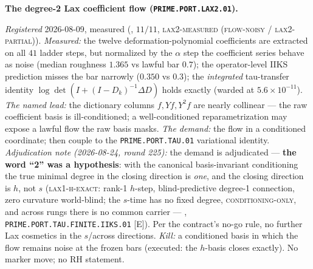 \documentclass[11pt,a4paper]{article}
\begin{document}
\par\smallskip\noindent\textbf{The degree-2 Lax coefficient flow
(\texttt{PRIME.PORT.\allowbreak LAX2.01}).}
{\sloppy
\emph{Registered} 2026-08-09, measured
(, $11/11$,
\textsc{lax2-measured (flow-noisy / lax2-partial)}).
\emph{Measured:} the twelve deformation-polynomial coefficients
are extracted on all $41$ ladder steps, but normalized by the
$\alpha$ step the coefficient series behave as noise (median
roughness $1.365$ vs lawful bar $0.7$); the operator-level IIKS
prediction misses the bar narrowly ($0.350$ vs $0.3$); the
\emph{integrated} tau-transfer identity $\log\det(I + (I -
D_k)^{-1}\Delta D)$ holds exactly (warded at
$5.6\times10^{-11}$).  \emph{The named lead:} the dictionary
columns $f, Yf, Y^2 f$ are nearly collinear --- the raw
coefficient basis is ill-conditioned; a well-conditioned
reparametrization may expose a lawful flow the raw basis masks.
\emph{The demand:} the flow in a conditioned coordinate; then
couple to the \texttt{PRIME.PORT.TAU.01} variational identity.
\emph{Adjudication note (2026-08-24, round 225):} the demand is
adjudicated --- \textbf{the word ``2'' was a hypothesis}: with
the canonical basis-invariant conditioning the true minimal
degree in the closing direction is \emph{one}, and the closing
direction is $h$, not $s$ (\textsc{lax1-h-exact}: rank-1
$h$-step, blind-predictive degree-1 connection, zero curvature
world-blind; the $s$-time has no fixed degree,
\textsc{conditioning-only}, and across rungs there is no common
carrier --- ,
\texttt{PRIME.PORT.TAU.FINITE.IIKS.01} [E]).  Per the contract's
no-go rule, no further Lax cosmetics in the $s$/across
directions.  \emph{Kill:} a conditioned basis in which the flow
remains noise at the frozen bars (executed: the $h$-basis
closes exactly).  No marker move; no RH statement.\par}
\end{document}
